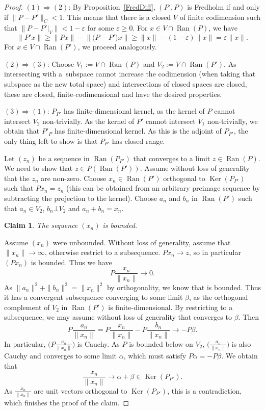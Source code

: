 \documentclass[10pt,a4paper]{amsart}
\numberwithin{equation}{section}
\newtheorem*{Claim}{Claim}
\DeclareMathOperator{\Ran}{Ran}
\DeclareMathOperator{\Ker}{Ker}
\begin{document}
	\begin{proof}
		$(1) \Rightarrow (2)$: By Proposition~\ref{FredDiff}, $(P',{P})$ is Fredholm if and only if $\|P-{P'}\|_C<1$. This means that there is a closed $V$ of finite codimension such that $\|P-{P'}|_V\|<1-\varepsilon$ for some $\varepsilon\geq 0$. For $x\in V\cap\Ran(P)$, we have
		\[\bigl\|{P'}x\bigr\|\geq\|Px\|-\bigl\|\bigl(P-{P'}\bigr)x\bigr\|\geq\|x\|-(1-\varepsilon)\|x\|=\varepsilon\|x\|.\]
		For $x\in V\cap \Ran({P'})$, we proceed analogously.
		
		$(2) \Rightarrow (3)$: Choose $V_1:=V\cap \Ran(P)$ and $V_2:=V\cap \Ran({P'})$. As intersecting with a~subspace cannot increase the codimension (when taking that subspace as the new total space) and intersections of closed spaces are closed, these are closed, finite-codimensional and have the desired properties.
				
		$(3)\Rightarrow (1)$:	
		$P_{P'}$ has finite-dimensional kernel, as the kernel of $P$ cannot intersect $V_2$ non-trivially. As the kernel of ${P'}$ cannot intersect $V_1$ non-trivially, we obtain that ${P'}_P$ has finite-dimensional kernel. As this is the adjoint of $P_{P'}$, the only thing left to show is that $P_{P'}$ has closed range.
		
		Let $(z_n)$ be a sequence in $\Ran(P_{P'})$ that converges to a limit $z\in\Ran(P)$. We need to show that $z\in P(\Ran(P'))$. Assume without loss of generality that the $z_n$ are non-zero. Choose $x_n\in \Ran({P'})$ orthogonal to $\Ker(P_{P'})$ such that $Px_n=z_n$ (this can be obtained from an arbitrary preimage sequence by subtracting the projection to the kernel). Choose $a_n$ and $b_n$ in $\Ran({P'})$ such that $a_n\in V_2$, $b_n\bot V_2$ and $a_n+b_n=x_n$.
		
\begin{Claim}
The sequence $(x_n)$ is bounded.
\end{Claim}
		
		Assume $(x_n)$ were unbounded. Without loss of generality, assume that $\|x_n\|\rightarrow\infty$, otherwise restrict to a subsequence. $Px_n\rightarrow z$, so in particular $(Px_n)$ is bounded. Thus we have
		\[P\frac{x_n}{\|x_n\|}\rightarrow 0.\]
		As $\|a_n\|^2+\|b_n\|^2=\|x_n\|^2$ by orthogonality, we know that  is bounded. Thus it has a convergent subsequence converging to some limit $\beta$, as the orthogonal complement of $V_2$ in $\Ran({P'})$ is finite-dimensional. By restricting to a subsequence, we may assume without loss of generality that  converges to $\beta$. Then
\[
P\frac{a_n}{\|x_n\|}=P\frac{x_n}{\|x_n\|}-P\frac{b_n}{\|x_n\|}\rightarrow-P\beta.
\]
		In particular, $\bigl(P\frac{a_n}{\|x_n\|}\bigr)$ is Cauchy. As $P$ is bounded below on $V_2$, $\bigl(\frac{a_n}{\|x_n\|}\bigr)$ is also Cauchy and converges to some limit $\alpha$, which must satisfy $P\alpha=-P\beta$. We obtain that
\[
\frac{x_n}{\|x_n\|}\rightarrow \alpha+\beta\in \Ker(P_{P'}).
\]
		As $\frac{x_n}{\|x_n\|}$ are unit vectors orthogonal to $\Ker(P_{P'})$, this is a contradiction, which finishes the proof of the claim.
		

\end{proof}
\end{document}
